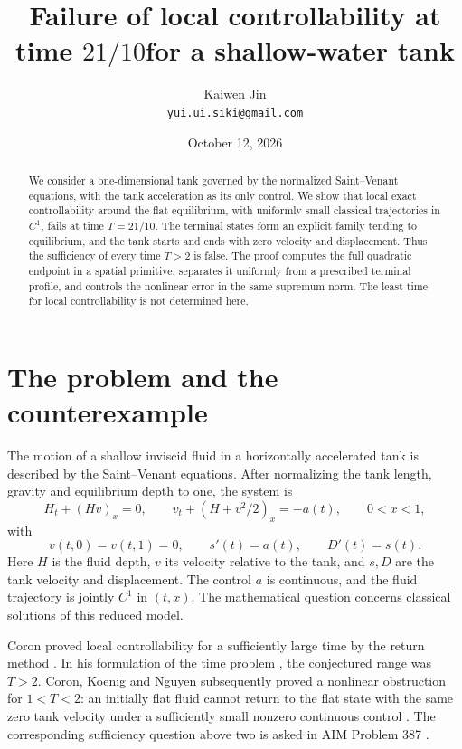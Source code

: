 \documentclass[11pt]{article}
\title{Failure of local controllability at time $21/10$\newline for a shallow-water tank}
\author{Kaiwen Jin\\\small\texttt{yui.ui.siki@gmail.com}}
\date{October 12, 2026}
\begin{document}
\maketitle
\begin{abstract}
We consider a one-dimensional tank governed by the normalized Saint--Venant
equations, with the tank acceleration as its only control. We show that local
exact controllability around the flat equilibrium, with uniformly small
classical trajectories in $C^1$, fails at time $T=21/10$. The terminal states
form an explicit family tending to equilibrium, and the tank starts and ends
with zero velocity and displacement. Thus the sufficiency of every time
$T>2$ is false. The proof computes the full quadratic endpoint in a spatial
primitive, separates it uniformly from a prescribed terminal profile, and
controls the nonlinear error in the same supremum norm. The least time for
local controllability is not determined here.
\end{abstract}

\section{The problem and the counterexample}
The motion of a shallow inviscid fluid in a horizontally accelerated tank is
described by the Saint--Venant equations. After normalizing the tank length,
gravity and equilibrium depth to one, the system is
\begin{equation}\label{eq:tank}
 H_t+(Hv)_x=0,\qquad
 v_t+(H+v^2/2)_x=-a(t),\qquad 0<x<1,
\end{equation}
with
\begin{equation}\label{eq:walls}
v(t,0)=v(t,1)=0,\qquad s'(t)=a(t),\qquad D'(t)=s(t).
\end{equation}
Here $H$ is the fluid depth, $v$ its velocity relative to the tank, and $s,D$
are the tank velocity and displacement. The control $a$ is continuous, and
the fluid trajectory is jointly $C^1$ in $(t,x)$. The mathematical question
concerns classical solutions of this reduced model.

Coron proved local controllability for a sufficiently large time by the
return method \cite[Theorem 2]{Coron2002}. In his formulation of the time
problem \cite[Problem 7.1, pp.~247--250]{Coron2004}, the conjectured range
was $T>2$. Coron, Koenig and Nguyen subsequently proved a nonlinear
obstruction for $1<T<2$: an initially flat fluid cannot return to the flat
state with the same zero tank velocity under a sufficiently small nonzero
continuous control \cite[Theorem 1.2]{CKN2024}. The corresponding sufficiency
question above two is asked in AIM Problem 387 \cite{AIM387}.
\end{document}
